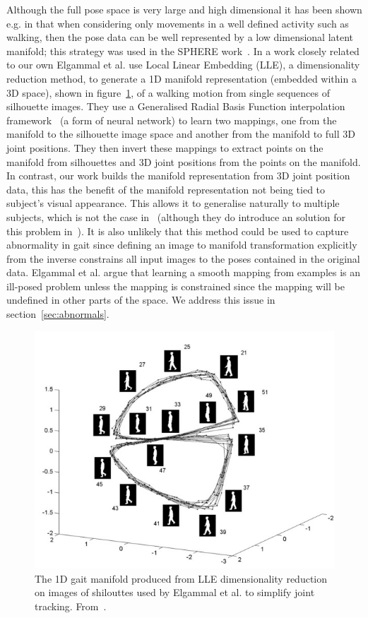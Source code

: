 \documentclass[11pt]{article} %
\begin{document}
Although the full pose space is very large and high dimensional it has been shown e.g. in \cite{Brand1999,Elgammal2004} that when considering only movements in a well defined activity such as walking, then the pose data can be well represented by a low dimensional latent manifold; this strategy was used in the SPHERE work~\cite{Paiement}. In a work closely related to our own Elgammal et al. \cite{Elgammal2004} use Local Linear Embedding (LLE), a dimensionality reduction method, to generate a 1D manifold representation (embedded within a 3D space), shown in figure~\ref{fig:elg}, of a walking motion from single sequences of silhouette images. They use a Generalised Radial Basis Function interpolation framework~\cite{Poggio1990} (a form of neural network) to learn two mappings, one from the manifold to the silhouette image space and another from the manifold to full 3D joint positions. They then invert these mappings to extract points on the manifold from silhouettes and 3D joint positions from the points on the manifold. In contrast, our work builds the manifold representation from 3D joint position data, this has the benefit of the manifold representation not being tied to subject's visual appearance. This allows it to generalise naturally to multiple subjects, which is not the case in~\cite{Elgammal2004} (although they do introduce an solution for this problem in~\cite{Elgammal2004a}). It is also unlikely that this method could be used to capture abnormality in gait since defining an image to manifold transformation explicitly from the inverse constrains all input images to the poses contained in the original data. Elgammal et al. argue that learning a smooth mapping from examples is an ill-posed problem unless the mapping is constrained since the mapping will be undefined in other parts of the space. We address this issue in section~\ref{sec:abnormals}.
\begin{figure}
\centering
\includegraphics*[width=0.6\linewidth,clip]{elgamel}
\caption{ The 1D gait manifold produced from LLE dimensionality reduction on images of shilouttes used by Elgammal et al. to simplify joint tracking. From~\cite{Elgammal2004}. \label{fig:elg}  } 
\end{figure}
\end{document}
